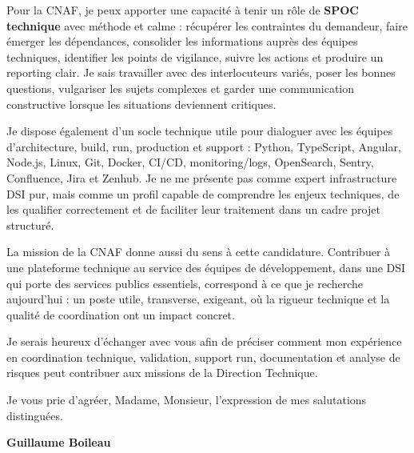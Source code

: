 \documentclass[11pt,a4paper]{altacv}
\begin{document}
{Pour la CNAF, je peux apporter une capacité à tenir un rôle de \textbf{SPOC technique} avec méthode et calme : récupérer les contraintes du demandeur, faire émerger les dépendances, consolider les informations auprès des équipes techniques, identifier les points de vigilance, suivre les actions et produire un reporting clair. Je sais travailler avec des interlocuteurs variés, poser les bonnes questions, vulgariser les sujets complexes et garder une communication constructive lorsque les situations deviennent critiques.

Je dispose également d'un socle technique utile pour dialoguer avec les équipes d'architecture, build, run, production et support : Python, TypeScript, Angular, Node.js, Linux, Git, Docker, CI/CD, monitoring/logs, OpenSearch, Sentry, Confluence, Jira et Zenhub. Je ne me présente pas comme expert infrastructure DSI pur, mais comme un profil capable de comprendre les enjeux techniques, de les qualifier correctement et de faciliter leur traitement dans un cadre projet structuré.

La mission de la CNAF donne aussi du sens à cette candidature. Contribuer à une plateforme technique au service des équipes de développement, dans une DSI qui porte des services publics essentiels, correspond à ce que je recherche aujourd'hui : un poste utile, transverse, exigeant, où la rigueur technique et la qualité de coordination ont un impact concret.

Je serais heureux d'échanger avec vous afin de préciser comment mon expérience en coordination technique, validation, support run, documentation et analyse de risques peut contribuer aux missions de la Direction Technique.

Je vous prie d'agréer, Madame, Monsieur, l'expression de mes salutations distinguées.

\textbf{Guillaume Boileau}

}
\end{document}
